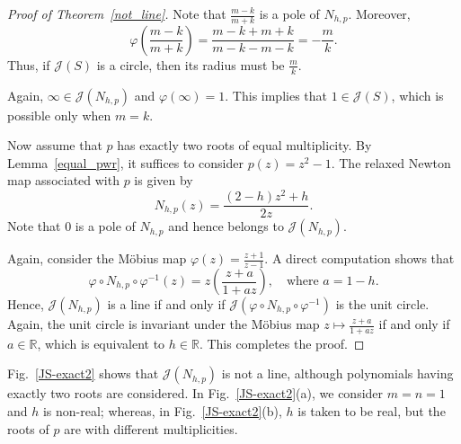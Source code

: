 \documentclass[12pt]{article}
\numberwithin{equation}{section}
\begin{document}
\begin{proof}[Proof of Theorem~\ref{not_line}]
Note that $\frac{m-k}{m+k}$
is a pole of $N_{h,p}$. Moreover,
$$\varphi\!\left(\frac{m-k}{m+k}\right)=\frac{m-k+m+k}{m-k-m-k}=-\frac{m}{k}.$$
Thus, if $\mathcal{J}(S)$ is a circle, then its radius must be $\frac{m}{k}$.
	
Again, $\infty\in\mathcal{J}(N_{h,p})$ and $\varphi(\infty)=1.$
This implies that $1\in\mathcal{J}(S)$, which is possible only when $m=k$.
	
Now assume that $p$ has exactly two roots of equal multiplicity. By Lemma~\ref{equal_pwr}, it suffices to consider $p(z)=z^2-1.$
The relaxed Newton map associated with $p$ is given by
$$N_{h,p}(z)=\frac{(2-h)z^2+h}{2z}.$$
Note that $0$ is a pole of $N_{h,p}$ and hence belongs to $\mathcal{J}(N_{h,p})$. 
	
Again, consider the M\"obius map $\varphi(z)=\frac{z+1}{z-1}.$
A direct computation shows that
$$
\varphi\circ N_{h,p}\circ \varphi^{-1}(z)= z\left(\frac{z+a}{1+az}\right),\quad \text{where } a=1-h.$$
Hence, $\mathcal{J}(N_{h,p})$ is a line if and only if
$\mathcal{J}(\varphi\circ N_{h,p}\circ \varphi^{-1})$
is the unit circle.
Again, the unit circle is invariant under the M\"obius map
$z\mapsto \frac{z+a}{1+az}$ if and only if $a\in\mathbb{R}$, which is equivalent to $h\in\mathbb{R}$. This completes the proof.
\end{proof}
Fig.~\ref{JS-exact2} shows that $\mathcal{J}(N_{h,p})$ is not a line, although polynomials having exactly two roots are considered. In Fig.~\ref{JS-exact2}(a), we consider $m=n=1$ and $h$ is non-real; whereas, in Fig.~\ref{JS-exact2}(b), $h$ is taken to be real, but the roots of $p$ are with different multiplicities.
\end{document}
